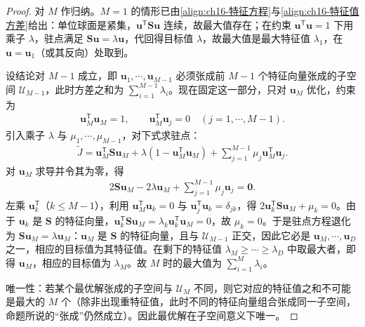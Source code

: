 \documentclass[../../main.tex]{subfiles}
\begin{document}
\begin{proof}
对 $M$ 作归纳。$M=1$ 的情形已由\eqref{align:ch16-特征方程}与\eqref{align:ch16-特征值方差}给出：单位球面是紧集，$\bm{u}^{\mathsf T}\bm{S}\bm{u}$ 连续，故最大值存在；在约束 $\bm{u}^{\mathsf T}\bm{u}=1$ 下用乘子 $\lambda$，驻点满足 $\bm{S}\bm{u}=\lambda\bm{u}$，代回得目标值 $\lambda$，故最大值是最大特征值 $\lambda_1$，在 $\bm{u}=\bm{u}_1$（或其反向）处取到。

设结论对 $M-1$ 成立，即 $\bm{u}_1,\cdots,\bm{u}_{M-1}$ 必须张成前 $M-1$ 个特征向量张成的子空间 $\mathcal{U}_{M-1}$，此时方差之和为 $\sum_{i=1}^{M-1}\lambda_i$。现在固定这一部分，只对 $\bm{u}_M$ 优化，约束为
\begin{align*}
  \bm{u}_M^{\mathsf T}\bm{u}_M=1,\qquad \bm{u}_M^{\mathsf T}\bm{u}_j=0\quad(j=1,\cdots,M-1).
\end{align*}
引入乘子 $\lambda$ 与 $\mu_1,\cdots,\mu_{M-1}$，对下式求驻点：
\begin{align*}
  \tilde{J}=\bm{u}_M^{\mathsf T}\bm{S}\bm{u}_M+\lambda(1-\bm{u}_M^{\mathsf T}\bm{u}_M)+\sum_{j=1}^{M-1}\mu_j\bm{u}_M^{\mathsf T}\bm{u}_j .
\end{align*}
对 $\bm{u}_M$ 求导并令其为零，得
\begin{align*}
  2\bm{S}\bm{u}_M-2\lambda\bm{u}_M+\sum_{j=1}^{M-1}\mu_j\bm{u}_j=\bm{0}.
\end{align*}
左乘 $\bm{u}_k^{\mathsf T}$（$k\leqslant M-1$），利用 $\bm{u}_M^{\mathsf T}\bm{u}_k=0$ 与 $\bm{u}_j^{\mathsf T}\bm{u}_k=\delta_{jk}$，得 $2\bm{u}_k^{\mathsf T}\bm{S}\bm{u}_M+\mu_k=0$。由于 $\bm{u}_k$ 是 $\bm{S}$ 的特征向量，$\bm{u}_k^{\mathsf T}\bm{S}\bm{u}_M=\lambda_k\bm{u}_k^{\mathsf T}\bm{u}_M=0$，故 $\mu_k=0$。于是驻点方程退化为 $\bm{S}\bm{u}_M=\lambda\bm{u}_M$：$\bm{u}_M$ 是 $\bm{S}$ 的特征向量，且与 $\mathcal{U}_{M-1}$ 正交，因此它必是 $\bm{u}_M,\cdots,\bm{u}_D$ 之一，相应的目标值为其特征值。在剩下的特征值 $\lambda_M\geqslant\cdots\geqslant\lambda_D$ 中取最大者，即得 $\bm{u}_M$，相应的目标值为 $\lambda_M$。故 $M$ 时的最大值为 $\sum_{i=1}^{M}\lambda_i$。

唯一性：若某个最优解张成的子空间与 $\mathcal{U}_M$ 不同，则它对应的特征值之和不可能是最大的 $M$ 个（除非出现重特征值，此时不同的特征向量组合张成同一子空间，命题所说的“张成”仍然成立）。因此最优解在子空间意义下唯一。
\end{proof}
\end{document}
